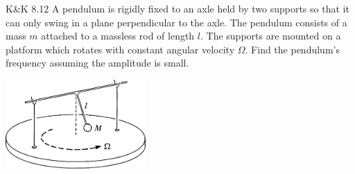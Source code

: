 \documentclass{esg8012pset}
\begin{document}
\begin{problem}{K\&K 8.12}
  A pendulum is rigidly fixed to an axle held by two supports so that it can only swing in a plane perpendicular to the axle. The pendulum consists of a mass $m$ attached to a massless rod of length $l$. The supports are mounted on a platform which rotates with constant angular velocity $\Omega$. Find the pendulum's frequency assuming the amplitude is small.
  \begin{center}\includegraphics[width=0.4\textwidth]{ps11_4}\end{center}
\end{problem}
\begin{solution}
\end{solution}
\end{document}
